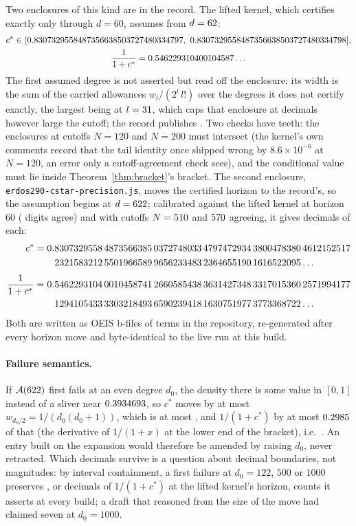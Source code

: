 \documentclass[11pt]{article}
\begin{document}
Two enclosures of this kind are in the record. The lifted kernel, which certifies exactly only through $d=60$, assumes from $d=62$:
\begin{gather*}
c^*\in[0.8307329558487356638503727480334797,\ 0.8307329558487356638503727480334798],\\
\frac1{1+c^*}=0.546229310400104587\ldots
\end{gather*}
The first assumed degree is not asserted but read off the enclosure: its width is the sum of the carried allowances $w_l/(2^l\,l!)$ over the degrees it does not certify exactly, the largest being \CondAllowFirst{} at $l=31$, which caps that enclosure at \CondCap{} decimals however large the cutoff; the record publishes \CondDigits. Two checks have teeth: the enclosures at cutoffs $N=120$ and $N=200$ must intersect (the kernel's own comments record that the tail identity once shipped wrong by $8.6\times10^{-6}$ at $N=120$, an error only a cutoff-agreement check sees), and the conditional value must lie inside Theorem~\ref{thm:bracket}'s bracket. The second enclosure, \texttt{erdos290-cstar-precision.js}, moves the certified horizon to the record's, so the assumption begins at $d=622$; calibrated against the lifted kernel at horizon $60$ (\PrecCalib{} digits agree) and with cutoffs $N=510$ and $570$ agreeing, it gives \CStarDigits{} decimals of each:
\begin{align*}
c^*&=0.\CStarFullA\\&\hphantom{{}=0.}\CStarFullB\ldots\\[2pt]
\frac1{1+c^*}&=0.\CZeroFullA\\&\hphantom{{}=0.}\CZeroFullB\ldots
\end{align*}
Both are written as OEIS b-files of \BfileTerms{} terms in the repository, re-generated after every horizon move and byte-identical to the live run at this build.

\paragraph{Failure semantics.} If $\mathcal A(622)$ first fails at an even degree $d_0$, the density there is some value in $[0,1]$ instead of a sliver near $0.3934693$, so $c^*$ moves by at most $w_{d_0/2}=1/(d_0(d_0+1))$, which is at most \FailC, and $1/(1+c^*)$ by at most $0.2985$ of that (the derivative of $1/(1+x)$ at the lower end of the bracket), i.e.\ \FailInv. An entry built on the expansion would therefore be amended by raising $d_0$, never retracted. Which decimals survive is a question about decimal boundaries, not magnitudes: by interval containment, a first failure at $d_0=122$, $500$ or $1000$ preserves \SensOne, \SensTwo{} or \SensThree{} decimals of $1/(1+c^*)$ at the lifted kernel's horizon, counts it asserts at every build; a draft that reasoned from the size of the move had claimed seven at $d_0=1000$.
\end{document}
